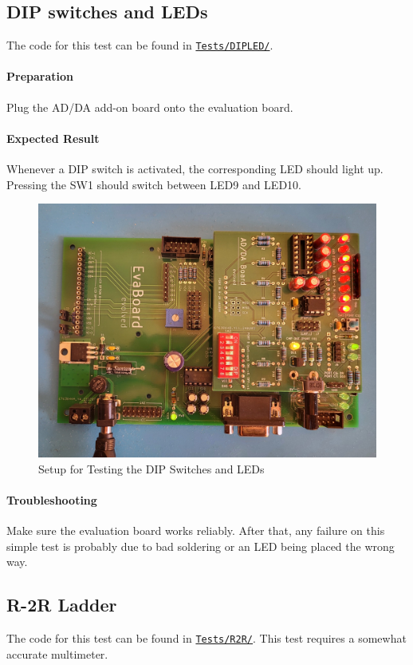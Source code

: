 \documentclass{article}
\newcommand{\file}[1]{\texttt{#1}}
\begin{document}
\subsection{DIP switches and LEDs}
The code for this test can be found in \href{../Tests/DIPLED/}{\file{Tests/DIPLED/}}. 

\paragraph{Preparation}
Plug the AD/DA add-on board onto the evaluation board. 

\paragraph{Expected Result}
Whenever a DIP switch is activated, the corresponding LED should light up. Pressing the SW1 should switch between LED9 and LED10. 

\begin{figure}[htb]
\centering
\includegraphics[width=.85\textwidth]{Pictures/DIPLED.jpg}
\caption{Setup for Testing the DIP Switches and LEDs}
\label{fig:dipLed}
\end{figure}

\paragraph{Troubleshooting}
Make sure the evaluation board works reliably. After that, any failure on this simple test is probably due to bad soldering or an LED being placed the wrong way. 

\subsection{R-2R Ladder}
The code for this test can be found in \href{../Tests/R2R/}{\file{Tests/R2R/}}. This test requires a somewhat accurate multimeter. 
\end{document}
